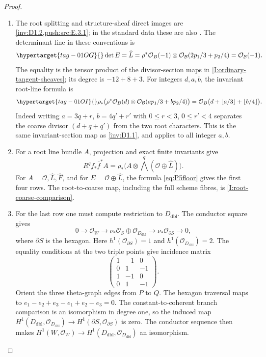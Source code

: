 \begin{proof}
\begin{enumerate}[label=\arabic*.,leftmargin=*]
\item The root splitting and structure-sheaf direct images are
\cref{inv:D1.2,push:src:E.3.1}; in the standard data these are also
\cite[Proposition~6.6, pp.~77--78; Lemma~6.7, p.~78;
Proposition~6.10, pp.~79--80]{DuEtAl2026v1}.
The determinant line in these conventions is
\begin{equation}\hypertarget{tag-01OG}{}\label{eq:P5L}
 \det E=\widehat L
 =\rho^*\mathcal O_B(-1)\otimes
   \mathcal O_{\mathcal B}(2p_1/3+p_2/4)
 =\mathcal O_{\mathcal B}(-1).
\end{equation}
The equality is the tensor product of the divisor-section maps
in \cref{I:ordinary-tangent-sheaves}; its degree is $-12+8+3$.
For integers $d,a,b$, the invariant root-line formula is
\begin{equation}\hypertarget{tag-01OI}{}\label{eq:P5floor}
 \rho_*\bigl(\rho^*\mathcal O_B(d)\otimes
 \mathcal O_{\mathcal B}(ap_1/3+bp_2/4)\bigr)
 =\mathcal O_B\bigl(d+\lfloor a/3\rfloor+\lfloor b/4\rfloor\bigr).
\end{equation}
Indeed writing $a=3q+r$, $b=4q'+r'$ with
$0\leq r<3$, $0\leq r'<4$ separates the coarse divisor
$(d+q+q')$ from the two root characters. This is the same
invariant-section map as \cref{inv:D1.1}, and applies to all
integer $a,b$.

\item For a root line bundle $A$, projection and exact finite
invariants give
\[
 R^qf_*\bar f^*A=\rho_*\bigl(A\otimes
              \bigwedge^q(\mathcal O\oplus\widehat L)\bigr).
\]
For $A=\mathcal O,\widehat L,\widehat F$, and for
$E=\mathcal O\oplus\widehat L$, the formula
\eqref{eq:P5floor} gives the first four rows. The root-to-coarse
map, including the full scheme fibres, is \cref{I:root-coarse-comparison}.

\item For the last row one must compute restriction to $D_{\mathrm{dbl}}$.  The conductor
square gives
\[
0\to\mathcal O_W\to\nu_*\mathcal O_S\oplus\mathcal O_{D_{\mathrm{dbl}}}
\to\nu_*\mathcal O_{\partial S}\to0,
\]
where $\partial S$ is the hexagon.  Here $h^1(\mathcal O_{\partial S})=1$
and $h^1(\mathcal O_{D_{\mathrm{dbl}}})=2$.  The equality conditions at the two triple
points give incidence matrix
\[
 \begin{pmatrix}1&-1&0\\0&1&-1\\1&-1&0\\0&1&-1\end{pmatrix}.
\]
Orient the three theta-graph edges from $P$ to $Q$.  The hexagon
traversal maps to $e_1-e_2+e_3-e_1+e_2-e_3=0$.  The constant-to-coherent
branch comparison is an isomorphism in degree one, so the induced map
$H^1(D_{\mathrm{dbl}},\mathcal O_{D_{\mathrm{dbl}}})\to H^1(\partial S,\mathcal O_{\partial S})$ is
zero.  The conductor sequence then makes
$H^1(W,\mathcal O_W)\to H^1(D_{\mathrm{dbl}},\mathcal O_{D_{\mathrm{dbl}}})$ an isomorphism.


\end{enumerate}
\end{proof}
